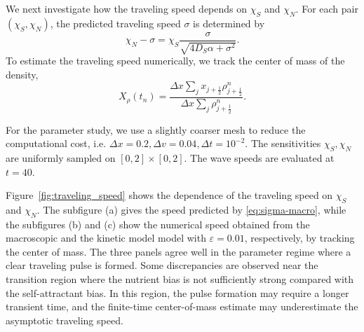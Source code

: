 \documentclass[11pt,twoside]{article}
\numberwithin{equation}{section}
\theoremstyle{plain}
\theoremstyle{nonumberplain}
\begin{document}
{We next investigate how the traveling speed depends on \(\chi_S\) and
\(\chi_N\). For each pair \((\chi_S,\chi_N)\), the predicted traveling
speed \(\sigma\) is determined by
\begin{equation}
\chi_N-\sigma
=
\chi_S
\frac{\sigma}{\sqrt{4D_S\alpha+\sigma^2}} .
\label{eq:sigma-macro}
\end{equation}
To estimate the traveling speed numerically, we track the center of
mass of the density,
\begin{equation}\label{eq: center of mass}
X_\rho(t_n)
=
\frac{
\Delta x\sum_j x_{j+\frac12}\rho_{j+\frac12}^n
}{
\Delta x\sum_j \rho_{j+\frac12}^n
}.
\end{equation}


For the parameter study, we use a slightly coarser
mesh to reduce the computational cost, i.e. 
\(
\Delta x=0.2,
\Delta v=0.04,
\Delta t=10^{-2}.
\)
The sensitivities \(\chi_S,\chi_N\) are uniformly sampled on \([0,2] \times [0,2]\). 
The wave speeds are evaluated at $t=40$.  

Figure~\ref{fig:traveling_speed} shows the dependence of the traveling
speed on \(\chi_S\) and \(\chi_N\). The subfigure (a) gives the speed
predicted by \eqref{eq:sigma-macro}, while the subfigures (b) and (c) show the
numerical speed obtained from the macroscopic and the kinetic model model with $\varepsilon=0.01$, respectively, by tracking the center of mass. 
The three panels agree well in the parameter regime where
a clear traveling pulse is formed. Some discrepancies are observed near
the transition region where the nutrient bias is not sufficiently strong
compared with the self-attractant bias. In this region, the pulse
formation may require a longer transient time, and the finite-time
center-of-mass estimate may underestimate the asymptotic traveling
speed. 


}
\end{document}
